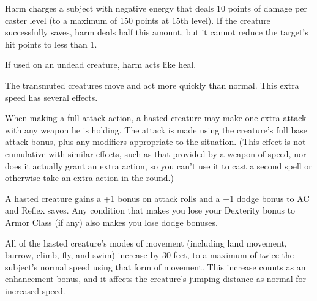 \begin{multicols}{2}
\begin{small}

\noindent Harm charges a subject with negative energy that deals 10 points of damage per caster level (to a maximum of 150 points at 15th level). If the creature successfully saves, harm deals half this amount, but it cannot reduce the target's hit points to less than 1.

\smallskip\noindent If used on an undead creature, harm acts like heal.

\noindent The transmuted creatures move and act more quickly than normal. This extra speed has several effects.

\smallskip\noindent When making a full attack action, a hasted creature may make one extra attack with any weapon he is holding. The attack is made using the creature's full base attack bonus, plus any modifiers appropriate to the situation. (This effect is not cumulative with similar effects, such as that provided by a weapon of speed, nor does it actually grant an extra action, so you can't use it to cast a second spell or otherwise take an extra action in the round.)

\smallskip\noindent A hasted creature gains a +1 bonus on attack rolls and a +1 dodge bonus to AC and Reflex saves. Any condition that makes you lose your Dexterity bonus to Armor Class (if any) also makes you lose dodge bonuses.

\smallskip\noindent All of the hasted creature's modes of movement (including land movement, burrow, climb, fly, and swim) increase by 30 feet, to a maximum of twice the subject's normal speed using that form of movement. This increase counts as an enhancement bonus, and it affects the creature's jumping distance as normal for increased speed.


\end{small}
\end{multicols}
